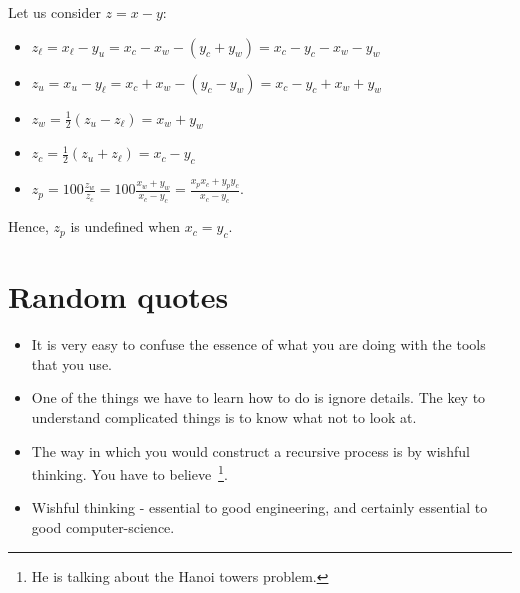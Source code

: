 \documentclass[12pt,a4paper]{article}
\begin{document}
Let us consider $z = x - y$:
\begin{itemize}
\item $z_{\ell} = x_{\ell} - y_{u} = x_c - x_w - (y_c + y_w) = x_c - y_c - x_w - y_w$
\item $z_{u} = x_{u} - y_{\ell} = x_c + x_w - (y_c - y_w) = x_c - y_c + x_w + y_w$
\item $z_w = \frac{1}{2}(z_u - z_{\ell}) = x_w + y_w$
\item $z_c = \frac{1}{2}(z_u + z_{\ell}) = x_c - y_c$
\item $z_p = 100\frac{z_w}{z_c} = 100\frac{x_w + y_w}{x_c - y_c} = \frac{x_px_c + y_py_c}{x_c - y_c}$.
\end{itemize}
Hence, $z_p$ is undefined when $x_c = y_c$.


\appendix
\appendixpage

\section{Random quotes}

\begin{itemize}
\item It is very easy to confuse the essence of what you are doing with the tools that
  you use.
\item One of the things we have to learn how to do is ignore details. The key to
  understand complicated things is to know what not to look at.
\item The way in which you would construct a recursive process is by wishful thinking.
  You have to believe~\footnote{He is talking about the Hanoi towers problem.}.
\item Wishful thinking - essential to good engineering, and certainly essential to good
  computer-science.
\end{itemize}

\nocite{*}


\end{document}
